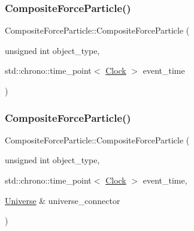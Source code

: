 \mbox{\label{classCompositeForceParticle_a805886058bba3179de8142fd266883e4}} 
\subsubsection{\texorpdfstring{Composite\+Force\+Particle()}{CompositeForceParticle()}\hspace{0.1cm}{\footnotesize\ttfamily [3/4]}}
{\footnotesize\ttfamily Composite\+Force\+Particle\+::\+Composite\+Force\+Particle (\begin{DoxyParamCaption}\item[{unsigned int}]{object\+\_\+type,  }\item[{std\+::chrono\+::time\+\_\+point$<$ \mbox{\hyperlink{universe_8h_a0ef8d951d1ca5ab3cfaf7ab4c7a6fd80}{Clock}} $>$}]{event\+\_\+time }\end{DoxyParamCaption})\hspace{0.3cm}{\ttfamily [inline]}}

\mbox{\label{classCompositeForceParticle_a8c311b3e35f6def3a532346a50c15281}} 
\subsubsection{\texorpdfstring{Composite\+Force\+Particle()}{CompositeForceParticle()}\hspace{0.1cm}{\footnotesize\ttfamily [4/4]}}
{\footnotesize\ttfamily Composite\+Force\+Particle\+::\+Composite\+Force\+Particle (\begin{DoxyParamCaption}\item[{unsigned int}]{object\+\_\+type,  }\item[{std\+::chrono\+::time\+\_\+point$<$ \mbox{\hyperlink{universe_8h_a0ef8d951d1ca5ab3cfaf7ab4c7a6fd80}{Clock}} $>$}]{event\+\_\+time,  }\item[{\mbox{\hyperlink{classUniverse}{Universe}} \&}]{universe\+\_\+connector }\end{DoxyParamCaption})\hspace{0.3cm}{\ttfamily [inline]}}

